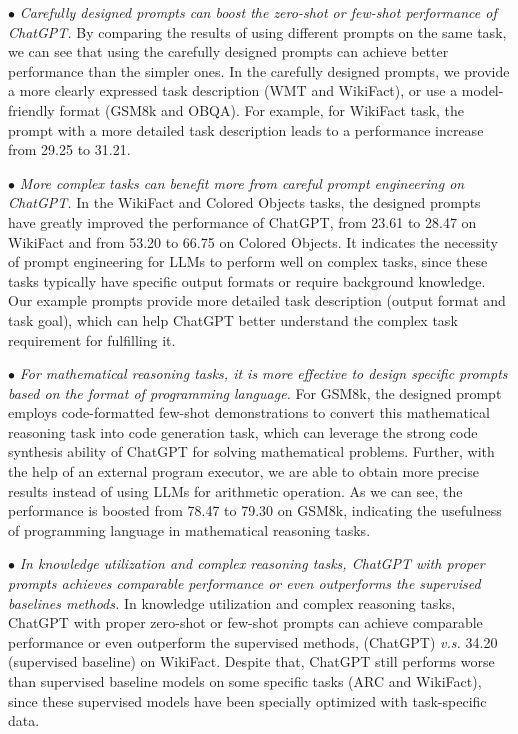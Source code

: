 $\bullet$ \emph{Carefully designed prompts can boost the zero-shot or few-shot performance of ChatGPT.} 
By comparing the results of using different prompts on the same task, we can see that using the carefully designed prompts  can achieve better performance than the simpler ones. 
{In the carefully designed prompts, we provide a more clearly expressed task description (\eg WMT and WikiFact), or use a model-friendly format (\eg GSM8k and OBQA). 
For example, for WikiFact task, the prompt with a more detailed task description leads to a performance increase  from 29.25 to 31.21.} 

$\bullet$ {\emph{More complex tasks can benefit more from careful prompt engineering on ChatGPT.}
In the WikiFact and Colored Objects tasks, the designed prompts have greatly improved the performance of ChatGPT, \ie from 23.61 to 28.47 on WikiFact and from 53.20 to 66.75 on Colored Objects.
It indicates the necessity of prompt engineering for LLMs to perform well on complex tasks, since these tasks typically have specific output formats or require background knowledge. 
Our example prompts  provide more detailed task description (\eg output format and task goal),  which can help ChatGPT better understand the complex task requirement  for fulfilling it.}

$\bullet$  {\emph{For mathematical reasoning tasks, it is more effective to design specific prompts based on the format of programming language.}
For GSM8k, the designed prompt employs code-formatted few-shot demonstrations to convert this mathematical reasoning task into code generation task, which can leverage the strong code synthesis ability of ChatGPT for solving mathematical problems. 
Further, with the help of an external program executor, we are able to obtain more precise results instead of using LLMs for arithmetic operation.
As we can see, the performance is boosted from 78.47 to 79.30 on GSM8k, indicating the usefulness of programming language in mathematical reasoning tasks.} %



$\bullet$ {\emph{In knowledge utilization and complex reasoning tasks, ChatGPT with proper prompts achieves comparable performance or even outperforms the supervised baselines methods.}
In knowledge utilization and  complex reasoning tasks, ChatGPT with proper zero-shot or few-shot prompts can achieve comparable performance or even outperform the supervised  methods, { (ChatGPT) \emph{v.s.} 34.20 (supervised baseline) on WikiFact.} 
Despite that, ChatGPT still performs worse than supervised baseline models on some specific tasks (\eg ARC and WikiFact), since these supervised models have been specially optimized with task-specific data.  
}


